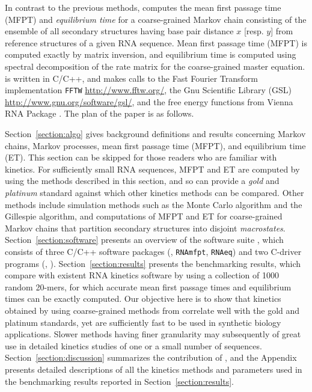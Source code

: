 In contrast to the previous methods, \hermes computes the mean
first passage time (MFPT) and {\em equilibrium time} for a
coarse-grained Markov chain consisting of the ensemble of all
secondary structures having base pair distance $x$ [resp. $y$] from
reference structures  of a given RNA sequence.
Mean first passage time (MFPT) is computed exactly by matrix inversion,
and equilibrium time is computed using spectral decomposition of the rate
matrix for the coarse-grained master equation.
\hermes is written in C/C++, and
makes calls to the Fast Fourier Transform implementation {\tt FFTW}
\cite{FFTW05} \url{http://www.fftw.org/}, the Gnu Scientific Library
(GSL) \url{http://www.gnu.org/software/gsl/}, and the free energy
functions from Vienna RNA Package \cite{Lorenz.amb11}. The plan of the
paper is as follows.

Section~\ref{section:algo} gives background definitions and results
concerning Markov chains, Markov processes, mean first passage time (MFPT),
and equilibrium time (ET). This section can be skipped for those readers
who are familiar with kinetics. For sufficiently small RNA sequences, MFPT and
ET are computed by \hermes using the methods described in this section,
and so can provide a {\em gold} and {\em platinum} standard against which
other kinetics methods can be compared. Other methods include
simulation methods such as the Monte Carlo algorithm and the Gillespie
algorithm, and computations of MFPT and ET for coarse-grained Markov
chains that partition secondary structures into disjoint {\em macrostates}.
Section~\ref{section:software} presents an overview of the software suite
\hermes, which consists of three C/C++ software packages
(\ffttwo, {\tt RNAmfpt}, {\tt RNAeq}) and two C-driver programs
(\fftmfpt, \ffteq).
Section~\ref{section:results} presents the benchmarking results,
which compare \hermes with
existent RNA kinetics software by using a collection of 1000
random 20-mers, for which accurate mean first passage times and equilibrium
times can be exactly computed. Our objective here is to show that kinetics
obtained by using coarse-grained methods from \hermes correlate well
with the gold and platinum standards, yet are sufficiently fast to be used
in synthetic biology applications. Slower methods having finer granularity
may subsequently of great use in detailed kinetics studies of one or
a small number of sequences.
Section~\ref{section:discussion} summarizes the contribution
of \hermes, and the Appendix presents detailed descriptions of
all the kinetics methods and parameters used in the benchmarking results
reported in Section~\ref{section:results}.



